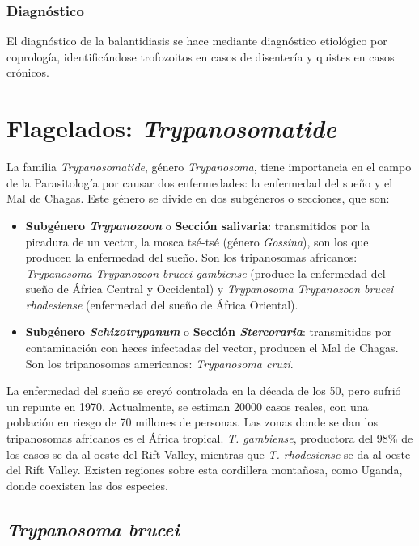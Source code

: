 \subsubsection{Diagnóstico}
El diagnóstico de la balantidiasis se hace mediante diagnóstico etiológico por coprología, identificándose trofozoitos en casos de disentería y quistes en casos crónicos.
\newpage
\section{Flagelados: \textit{Trypanosomatide}}
La familia \textit{Trypanosomatide}, género \textit{Trypanosoma}, tiene importancia en el campo de la Parasitología por causar dos enfermedades: la enfermedad del sueño y el Mal de Chagas. Este género se divide en dos subgéneros o secciones, que son:
\begin{itemize}[itemsep=0pt,parsep=0pt,topsep=0pt,partopsep=0pt]
	\item \textbf{Subgénero \textit{Trypanozoon}} o \textbf{Sección salivaria}: transmitidos por la picadura de un vector, la mosca tsé-tsé (género \textit{Gossina}), son los que producen la enfermedad del sueño. Son los tripanosomas africanos: \textit{Trypanosoma Trypanozoon brucei gambiense} (produce la enfermedad del sueño de África Central y Occidental) y \textit{Trypanosoma Trypanozoon brucei rhodesiense} (enfermedad del sueño de África Oriental). 
	\item \textbf{Subgénero \textit{Schizotrypanum}} o \textbf{Sección \textit{Stercoraria}}: transmitidos por contaminación con heces infectadas del vector, producen el Mal de Chagas. Son los tripanosomas americanos: \textit{Trypanosoma cruzi}.
\end{itemize}

La enfermedad del sueño se creyó controlada en la década de los 50, pero sufrió un repunte en 1970. Actualmente, se estiman 20000 casos reales, con una población en riesgo de 70 millones de personas. Las zonas donde se dan los tripanosomas africanos es el África tropical. \textit{T. gambiense}, productora del 98\% de los casos se da al oeste del Rift Valley, mientras que \textit{T. rhodesiense} se da al oeste del Rift Valley. Existen regiones sobre esta cordillera montañosa, como Uganda, donde coexisten las dos especies.
\newpage
\subsection{\textit{Trypanosoma brucei}}
